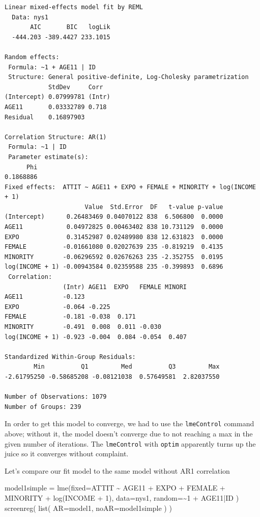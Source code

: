 \documentclass[
  letterpaper,
  DIV=11,
  numbers=noendperiod]{scrreprt}
\newenvironment{Shaded}{}{}
\newcommand{\AttributeTok}[1]{\textcolor[rgb]{0.49,0.56,0.16}{#1}}
\newcommand{\DecValTok}[1]{\textcolor[rgb]{0.25,0.63,0.44}{#1}}
\newcommand{\FunctionTok}[1]{\textcolor[rgb]{0.02,0.16,0.49}{#1}}
\newcommand{\NormalTok}[1]{#1}
\newcommand{\OtherTok}[1]{\textcolor[rgb]{0.00,0.44,0.13}{#1}}
\newcommand{\SpecialCharTok}[1]{\textcolor[rgb]{0.25,0.44,0.63}{#1}}
\begin{document}
\begin{verbatim}
Linear mixed-effects model fit by REML
  Data: nys1 
       AIC       BIC   logLik
  -444.203 -389.4427 233.1015

Random effects:
 Formula: ~1 + AGE11 | ID
 Structure: General positive-definite, Log-Cholesky parametrization
            StdDev     Corr  
(Intercept) 0.07999781 (Intr)
AGE11       0.03332789 0.718 
Residual    0.16897903       

Correlation Structure: AR(1)
 Formula: ~1 | ID 
 Parameter estimate(s):
      Phi 
0.1868886 
Fixed effects:  ATTIT ~ AGE11 + EXPO + FEMALE + MINORITY + log(INCOME + 1) 
                      Value  Std.Error  DF   t-value p-value
(Intercept)      0.26483469 0.04070122 838  6.506800  0.0000
AGE11            0.04972825 0.00463402 838 10.731129  0.0000
EXPO             0.31452987 0.02489980 838 12.631823  0.0000
FEMALE          -0.01661080 0.02027639 235 -0.819219  0.4135
MINORITY        -0.06296592 0.02676263 235 -2.352755  0.0195
log(INCOME + 1) -0.00943584 0.02359588 235 -0.399893  0.6896
 Correlation: 
                (Intr) AGE11  EXPO   FEMALE MINORI
AGE11           -0.123                            
EXPO            -0.064 -0.225                     
FEMALE          -0.181 -0.038  0.171              
MINORITY        -0.491  0.008  0.011 -0.030       
log(INCOME + 1) -0.923 -0.004  0.084 -0.054  0.407

Standardized Within-Group Residuals:
        Min          Q1         Med          Q3         Max 
-2.61795250 -0.58685208 -0.08121038  0.57649581  2.82037550 

Number of Observations: 1079
Number of Groups: 239 
\end{verbatim}

In order to get this model to converge, we had to use the
\texttt{lmeControl} command above; without it, the model doesn't
converge due to not reaching a max in the given number of iterations.
The \texttt{lmeControl} with \texttt{optim} apparently turns up the
juice so it converges without complaint.

Let's compare our fit model to the same model without AR1 correlation

\begin{Shaded}
\begin{Highlighting}[]
\NormalTok{model1simple }\OtherTok{=} \FunctionTok{lme}\NormalTok{(}\AttributeTok{fixed=}\NormalTok{ATTIT }\SpecialCharTok{\textasciitilde{}}\NormalTok{ AGE11 }\SpecialCharTok{+}\NormalTok{ EXPO }\SpecialCharTok{+}\NormalTok{ FEMALE }\SpecialCharTok{+}\NormalTok{ MINORITY }\SpecialCharTok{+} \FunctionTok{log}\NormalTok{(INCOME }\SpecialCharTok{+} \DecValTok{1}\NormalTok{), }
             \AttributeTok{data=}\NormalTok{nys1,}
             \AttributeTok{random=}\SpecialCharTok{\textasciitilde{}}\DecValTok{1} \SpecialCharTok{+}\NormalTok{ AGE11}\SpecialCharTok{|}\NormalTok{ID )}
\FunctionTok{screenreg}\NormalTok{( }\FunctionTok{list}\NormalTok{( }\AttributeTok{AR=}\NormalTok{model1, }\AttributeTok{noAR=}\NormalTok{model1simple ) )}
\end{Highlighting}
\end{Shaded}
\end{document}
